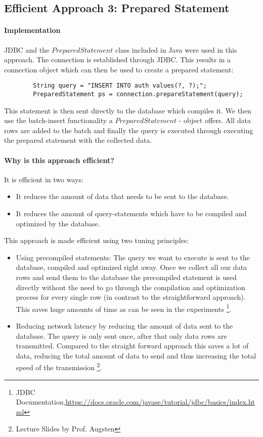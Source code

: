 \documentclass[11pt]{scrartcl}
\begin{document}
    \subsection*{Efficient Approach 3: Prepared Statement}

  \paragraph{Implementation}

	JDBC and the $PreparedStatement$ class included in Java were used in this approach. The connection is established through JDBC. This results in a connection object which can then be used to create a prepared statement:
	{\small
	\begin{verbatim}
		String query = "INSERT INTO auth values(?, ?);";
		PreparedStatement ps = connection.prepareStatement(query);
	\end{verbatim}
	}

	This statement is then sent directly to the database which compiles it. We then use the batch-insert functionality a $PreparedStatement$ - object offers. All data rows are added to the batch and finally the query is executed through executing the prepared statement with the collected data.

  \paragraph{Why is this approach efficient?}

  It is efficient in two ways:
  \begin{itemize}
  	\item It reduces the amount of data that needs to be sent to the database.
  	\item It reduces the amount of query-statements which have to be compiled and optimized by the database.
  \end{itemize}

	This approach is made efficient using two tuning principles:
	\begin{itemize}
		\item Using precompiled statements: The query we want to execute is sent to the database, compiled and optimized  right away. Once we collect all our data rows and send them to the database the precompiled statement is used directly without the need to go through the compilation and optimization process for every single row (in contrast to the straightforward approach). This saves huge amounts of time as can be seen in the experiments
        \footnote{JDBC Documentation,\url{https://docs.oracle.com/javase/tutorial/jdbc/basics/index.html}}.
		\item Reducing network latency by reducing the amount of data sent to the database. The query is only sent once, after that only data rows are transmitted. Compared to the straight forward approach this saves a lot of data, reducing the total amount of data to send and thus increasing the total speed of the transmission
        \footnote{Lecture Slides by Prof. Augsten}.
\end{itemize}
\end{document}
